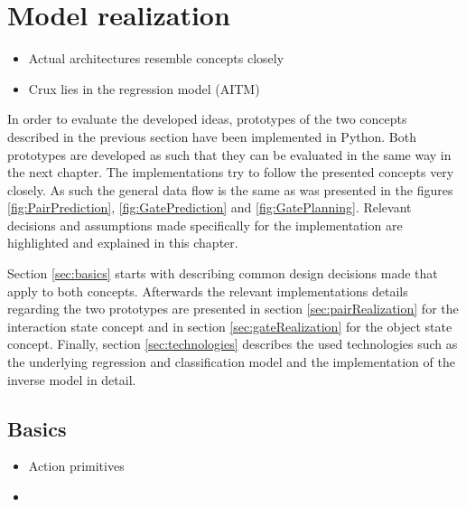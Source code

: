\chapter{Model realization\label{chap:modelReal}}



\begin{itemize}
	\item Actual architectures resemble concepts closely
	\item Crux lies in the regression model (AITM)
\end{itemize}

In order to evaluate the developed ideas, prototypes of the two concepts described in the previous section have been implemented in Python. Both prototypes are developed as such that they can be evaluated in the same way in the next chapter. The implementations try to follow the presented concepts very closely. As such the general data flow is the same as was presented in the figures  \ref{fig:PairPrediction}, \ref{fig:GatePrediction} and \ref{fig:GatePlanning}.
Relevant decisions and assumptions made specifically for the implementation are highlighted and explained in this chapter.

Section \ref{sec:basics} starts with describing common design decisions made that apply to both concepts. Afterwards the relevant implementations details regarding the two prototypes are presented in section \ref{sec:pairRealization} for the interaction state concept and in section \ref{sec:gateRealization} for the object state concept. Finally, section \ref{sec:technologies} describes the used technologies such as the underlying regression and classification model and the implementation of the inverse model in detail.

\section{Basics \label{sec:basics}}


\begin{itemize}
\item Action primitives
\item 
\end{itemize}


